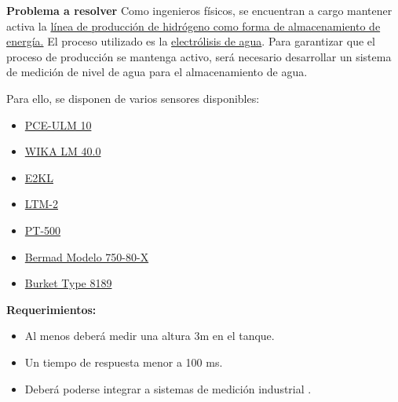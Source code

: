 \documentclass[12pt]{article}
\begin{document}
\setlength{\parindent}{0em}

\noindent\textbf{Problema a resolver}
\newline
\newline
Como ingenieros físicos, se encuentran a cargo mantener activa la \href{https://www.nacion.com/economia/politica-economica/video-franklin-chang-de-ad-astra-rocket-explica/871a4a67-9142-45cd-8df2-d6f4e88f6d81/video/}{línea de producción de hidrógeno como forma de almacenamiento de energía.} El proceso utilizado es la \href{https://en.wikipedia.org/wiki/Electrolysis_of_water}{electrólisis de agua}. Para garantizar que el proceso de producción se mantenga activo, será necesario desarrollar un sistema de medición de nivel de agua para el almacenamiento de agua. 

Para ello, se disponen de varios sensores disponibles: 
\begin{itemize}
    \item \href{https://www.pce-iberica.es/hoja-datos/hoja-datos-pce-ulm-10.pdf}{PCE-ULM 10}
    \item \href{https://www.gavasa.com/wp-content/uploads/2020/09/Wika_LF-1.pdf}{WIKA LM 40.0}
    \item \href{http://www.contrall.com.co/pdf-productos/E2KL.pdf}{E2KL}
    \item \href{https://irp-cdn.multiscreensite.com/964ff6b3/files/uploaded/LTM-2_50061_1.2_pt_eu.pdf}{LTM-2}
    \item \href{https://www.binmaster.com/_resources/dyn/files/75755645zd70b61f0/_fn/PT500_SpecSheet_ES631219062.pdf}{PT-500}
     \item \href{https://www.bermad.com/app/uploads/2016/06/ww-750-80-x-spanish.pdf}{Bermad Modelo 750-80-X}
     \item \href{https://www.burkert.com/en/Media/plm/DTS/DS/DS8189-standard-EU-EN.pdf?id=DTS0000000000000001000244852ENE}{Burket Type 8189}
\end{itemize}
 

\vspace{0.5cm}
\noindent\textbf{Requerimientos:}
\begin{itemize}
    \item Al menos deberá medir una altura 3m en el tanque. 
    \item Un tiempo de respuesta menor a 100 \si{\milli s}.
    \item Deberá poderse integrar a sistemas de medición industrial .
\end{itemize}
\end{document}
